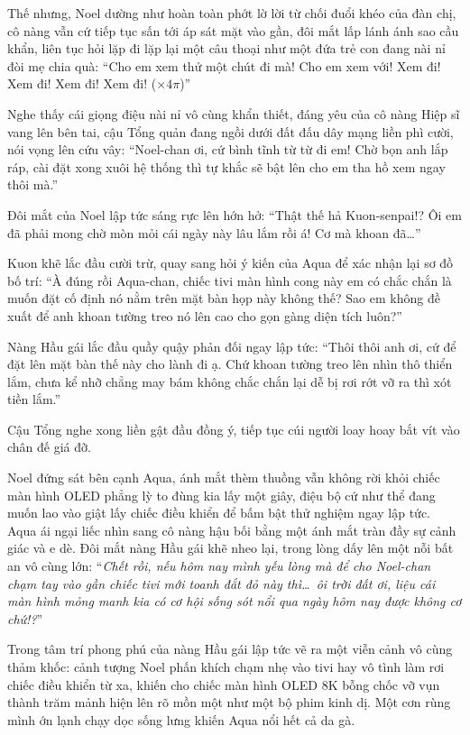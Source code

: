 \documentclass[../main.tex]{subfiles}
\begin{document}
Thế nhưng, Noel dường như hoàn toàn phớt lờ lời từ chối đuổi khéo của đàn chị, cô nàng vẫn cứ tiếp tục sấn tới áp sát mặt vào gần, đôi mắt lấp lánh ánh sao cầu khẩn, liên tục hỏi lặp đi lặp lại một câu thoại như một đứa trẻ con đang nài nỉ đòi mẹ chia quà: ``Cho em xem thử một chút đi mà! Cho em xem với! Xem đi! Xem đi! Xem đi! Xem đi! (\(\times4\pi\))''

Nghe thấy cái giọng điệu nài nỉ vô cùng khẩn thiết, đáng yêu của cô nàng Hiệp sĩ vang lên bên tai, cậu Tổng quản đang ngồi dưới đất đấu dây mạng liền phì cười, nói vọng lên cứu vây: ``Noel-chan ơi, cứ bình tĩnh từ từ đi em! Chờ bọn anh lắp ráp, cài đặt xong xuôi hệ thống thì tự khắc sẽ bật lên cho em tha hồ xem ngay thôi mà.''

Đôi mắt của Noel lập tức sáng rực lên hớn hở: ``Thật thế hả Kuon-senpai!? Ôi em đã phải mong chờ mòn mỏi cái ngày này lâu lắm rồi á! Cơ mà khoan đã\dots''

Kuon khẽ lắc đầu cười trừ, quay sang hỏi ý kiến của Aqua để xác nhận lại sơ đồ bố trí: ``À đúng rồi Aqua-chan, chiếc tivi màn hình cong này em có chắc chắn là muốn đặt cố định nó nằm trên mặt bàn họp này không thế? Sao em không đề xuất để anh khoan tường treo nó lên cao cho gọn gàng diện tích luôn?''

Nàng Hầu gái lắc đầu quầy quậy phản đối ngay lập tức: ``Thôi thôi anh ơi, cứ để đặt lên mặt bàn thế này cho lành đi ạ. Chứ khoan tường treo lên nhìn thô thiển lắm, chưa kể nhỡ chẳng may bám không chắc chắn lại dễ bị rơi rớt vỡ ra thì xót tiền lắm.''

Cậu Tổng nghe xong liền gật đầu đồng ý, tiếp tục cúi người loay hoay bắt vít vào chân đế giá đỡ.

Noel đứng sát bên cạnh Aqua, ánh mắt thèm thuồng vẫn không rời khỏi chiếc màn hình OLED phẳng lỳ to đùng kia lấy một giây, điệu bộ cứ như thể đang muốn lao vào giật lấy chiếc điều khiển để bấm bật thử nghiệm ngay lập tức. Aqua ái ngại liếc nhìn sang cô nàng hậu bối bằng một ánh mắt tràn đầy sự cảnh giác và e dè. Đôi mắt nàng Hầu gái khẽ nheo lại, trong lòng dấy lên một nỗi bất an vô cùng lớn: ``\textit{Chết rồi, nếu hôm nay mình yếu lòng mà để cho Noel-chan chạm tay vào gần chiếc tivi mới toanh đắt đỏ này thì\dots\ ôi trời đất ơi, liệu cái màn hình mỏng manh kia có cơ hội sống sót nổi qua ngày hôm nay được không cơ chứ!?}''

Trong tâm trí phong phú của nàng Hầu gái lập tức vẽ ra một viễn cảnh vô cùng thảm khốc: cảnh tượng Noel phấn khích chạm nhẹ vào tivi hay vô tình làm rơi chiếc điều khiển từ xa, khiến cho chiếc màn hình OLED 8K bỗng chốc vỡ vụn thành trăm mảnh hiện lên rõ mồn một như một bộ phim kinh dị. Một cơn rùng mình ớn lạnh chạy dọc sống lưng khiến Aqua nổi hết cả da gà.
\end{document}
